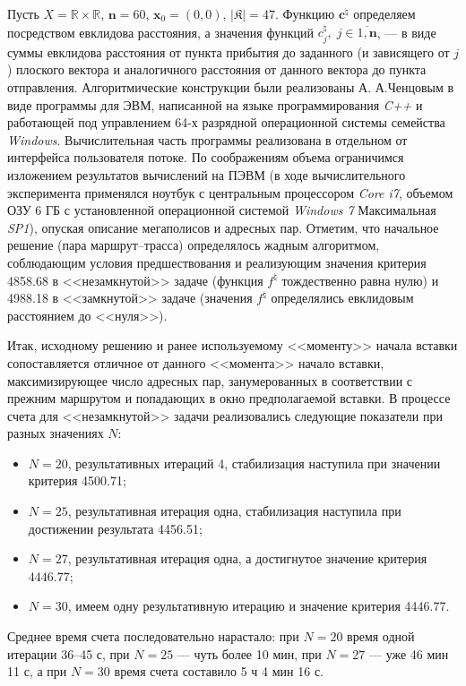Пусть
$X=\mathbb{R}\times\mathbb{R}$, $\mathbf{n}=60$,
$\mathbf{x}_0=(0,0)$,
$\vert \mathfrak{K} \vert=47$.
Функцию $\mathbf{c}^{\natural}$
определяем посредством евклидова расстояния,
а значения функций
$c_j^{\natural},\;j \in \overline{1,\mathbf{n}}$, ---
в виде суммы евклидова расстояния от пункта прибытия до заданного
(и зависящего от $j$)
плоского вектора и аналогичного расстояния от данного
вектора до пункта отправления.
Алгоритмические конструкции были реализованы
А. А.Ченцовым в виде программы для ЭВМ,
написанной на языке программирования {\it C++}
и работающей под управлением 64-х разрядной операционной
системы семейства {\it Windows}.
Вычислительная часть программы реализована в отдельном от интерфейса пользователя потоке.
По соображениям объема ограничимся изложением результатов вычислений на ПЭВМ
(в ходе вычислительного эксперимента применялся ноутбук с центральным процессором
{\it Core i7}, объемом ОЗУ 6 ГБ
с установленной операционной системой
{\it Windows 7} Максимальная {\it SP1}),
опуская описание мегаполисов и адресных пар.
Отметим, что
начальное решение (пара маршрут--трасса)
определялось жадным алгоритмом, соблюдающим условия предшествования
и реализующим значения критерия 4858.68 в <<незамкнутой>> задаче
(функция $f^{\natural}$ тождественно равна нулю)
и 4988.18 в <<замкнутой>> задаче
(значения $f^{\natural}$ определялись евклидовым расстоянием до <<нуля>>).

Итак, исходному решению и ранее используемому <<моменту>> начала
вставки сопоставляется отличное от данного <<момента>> начало вставки,
максимизирующее число адресных пар,
занумерованных в соответствии с прежним маршрутом и попадающих в
окно предполагаемой вставки.
В процессе счета для <<незамкнутой>> задачи
реализовались следующие показатели
при разных значениях $N$:

\begin{itemize}
  \item
  $N=20$, результативных итераций 4, стабилизация наступила при значении критерия 4500.71;
  \item
  $N=25$, результативная итерация одна, стабилизация наступила при достижении результата 4456.51;
  \item
  $N=27$, результативная итерация одна, а достигнутое значение критерия $4446.77$;
  \item
  $N=30$, имеем одну результативную итерацию и значение критерия 4446.77.
\end{itemize}

Среднее время счета последовательно нарастало:
при $N=20$ время одной итерации 36--45 с,
при $N=25$ --- чуть более 10 мин,
при $N=27$ --- уже 46 мин 11 с,
а при $N=30$ время счета составило 5 ч 4 мин 16 с.

